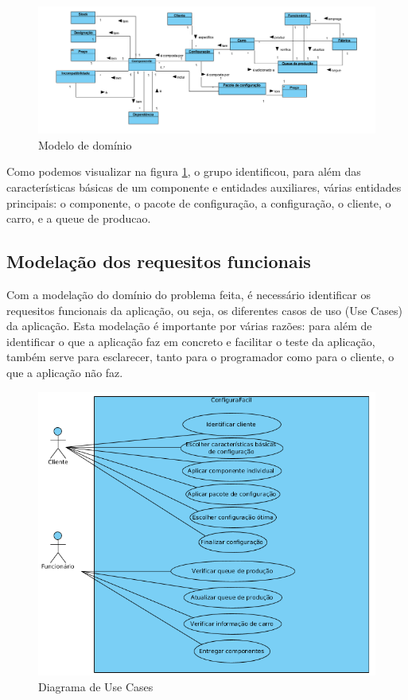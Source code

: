 \documentclass{llncs}
\begin{document}
\begin{figure}
\begin{center}
\includegraphics[scale=0.25]{modelo_de_dominio.png} 
\end{center}
\caption{\label{fig:modelo_dominio}Modelo de domínio}
\end{figure} 


Como podemos visualizar na figura \ref{fig:modelo_dominio}, o grupo identificou, para além das características básicas de um componente e entidades auxiliares, várias entidades principais: o componente, o pacote de configuração, a configuração, o cliente, o carro, e a queue de producao. 

\subsection{Modelação dos requesitos funcionais}

Com a modelação do domínio do problema feita, é necessário identificar os requesitos funcionais da aplicação, ou seja, os diferentes casos de uso (Use Cases) da aplicação. Esta modelação é importante por várias razões: para além de identificar o que a aplicação faz em concreto e facilitar o teste da aplicação, também serve para esclarecer, tanto para o programador como para o cliente, o que a aplicação não faz.

\begin{figure}
\begin{center}
\includegraphics[scale=0.40]{diagrama_use_cases.png} 
\end{center}
\caption{\label{fig:diagrama_use_cases}Diagrama de Use Cases}
\end{figure} 
\end{document}
